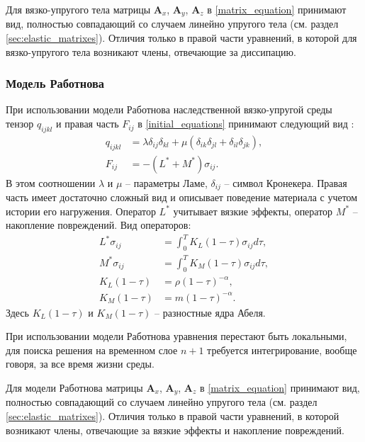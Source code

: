 Для вязко-упругого тела матрицы $\mathbf{A}_x$, $\mathbf{A}_y$, $\mathbf{A}_z$ в \eqref{matrix_equation} принимают вид, полностью совпадающий со случаем линейно упругого тела (см. раздел \ref{sec:elastic_matrixes}). Отличия только в правой части уравнений, в которой для вязко-упругого тела возникают члены, отвечающие за диссипацию.


\subsubsection{Модель Работнова}
\label{rabotnov_matrixes}

При использовании модели Работнова наследственной вязко-упругой среды тензор $q_{ijkl}$ и правая часть $F_{ij}$ в \eqref{initial_equations} принимают следующий вид \cite{rabotnov, polilov}:
\begin{align}
\label{tensor_qijkl_rabotnov}
q_{ijkl}&=\lambda\delta_{ij}\delta_{kl}+\mu(\delta_{ik}\delta_{jl}+\delta_{il}
\delta_{jk}),\nonumber\\
F_{ij}&=-(L^*+M^*)\sigma_{ij}.
\end{align}
В этом соотношении $\lambda$ и $\mu$ -- параметры Ламе, $\delta_{ij}$ -- символ Кронекера. Правая часть имеет достаточно сложный вид и описывает поведение материала с учетом истории его нагружения. Оператор $L^*$ учитывает вязкие эффекты, оператор $M^*$ -- накопление повреждений. Вид операторов:
\begin{align}
\label{right_hand_rabotnov}
L^*\sigma_{ij} &= \int_0^T{K_L(1-\tau)\sigma_{ij}d\tau}, \nonumber\\
M^*\sigma_{ij} &= \int_0^T{K_M(1-\tau)\sigma_{ij}d\tau}, \nonumber\\
K_L(1-\tau)&=\rho(1-\tau)^{-\alpha}, \nonumber\\
K_M(1-\tau)&=m(1-\tau)^{-\alpha}.
\end{align}
Здесь $K_L(1-\tau)$ и $K_M(1-\tau)$ -- разностные ядра Абеля.

При использовании модели Работнова уравнения перестают быть локальными, для поиска решения на временном слое $n+1$ требуется интегрирование, вообще говоря, за все время жизни среды.

Для модели Работнова матрицы $\mathbf{A}_x$, $\mathbf{A}_y$, $\mathbf{A}_z$ в \eqref{matrix_equation} принимают вид, полностью совпадающий со случаем линейно упругого тела (см. раздел \ref{sec:elastic_matrixes}). Отличия только в правой части уравнений, в которой возникают члены, отвечающие за вязкие эффекты и накопление повреждений.

